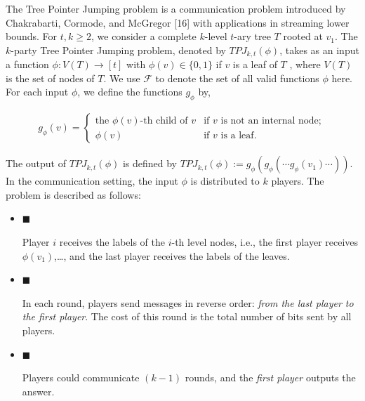 \documentclass[10pt,a4paper]{article}
\begin{document}
The Tree Pointer Jumping problem is a communication problem introduced by Chakrabarti, Cormode, and McGregor [16] with applications in streaming lower bounds. For $t,k\geq 2$, we consider a complete $k$-level $t$-ary tree $T$ rooted at $v_{1}$. The $k$-party Tree Pointer Jumping problem, denoted by $\textit{TPJ}_{k,t}(\phi)$, takes as an input a function $\phi:V(T)\rightarrow[t]$ with $\phi(v)\in\{0,1\}$ if $v$ is a leaf of $T$ , where $V(T)$ is the set of nodes of $T$. We use $\mathcal{F}$ to denote the set of all valid functions $\phi$ here. For each input $\phi$, we define the functions $g_{\phi}$ by,\par


\[\begin{gathered}
g_{\phi}(v)=\begin{cases}\text{the $\phi(v)$-th child of $v$}&\text{if $v$ is not an internal node};\\
\phi(v)&\text{if $v$ is a leaf}.\end{cases}
\end{gathered}\]




The output of $TPJ_{k,t}(\phi)$ is defined by $TPJ_{k,t}(\phi):=g_{\phi}(g_{\phi}(\cdots g_{\phi}(v_{1})\cdots)).$ In the communication setting, the input $\phi$ is distributed to $k$ players. The problem is described as follows:\par




\begin{itemize}


\item[] 
$\blacksquare$ 


Player $i$ receives the labels of the $i$-th level nodes, i.e., the first player receives $\phi(v_{1})$,…, and the last player receives the labels of the leaves.\par





\item[] 
$\blacksquare$ 


In each round, players send messages in reverse order: \emph{from the last player to the first player}. The cost of this round is the total number of bits sent by all players.\par





\item[] 
$\blacksquare$ 


Players could communicate $(k-1)$ rounds, and the \emph{first player} outputs the answer.\par





\end{itemize}
\end{document}
